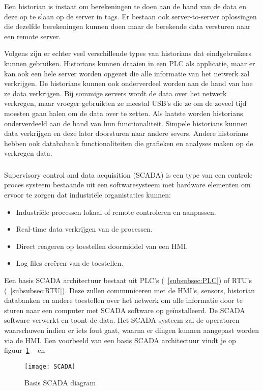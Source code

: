 Een historian is instaat om berekeningen te doen aan de hand van de data en deze op te slaan op de server in tags. Er bestaan ook server-to-server oplossingen die dezelfde berekeningen kunnen doen maar de berekende data versturen naar een remote server.~\autocite{Solutions} 

Volgens \textcite{Rinaldi} zijn er echter veel verschillende types van historians dat eindgebruikers kunnen gebruiken. Historians kunnen draaien in een PLC als applicatie, maar er kan ook een hele server worden opgezet die alle informatie van het netwerk zal verkrijgen. De historians kunnen ook onderverdeel worden aan de hand van hoe ze data verkrijgen. Bij sommige servers wordt de data over het netwerk verkregen, maar vroeger gebruikten ze meestal USB's die ze om de zoveel tijd moesten gaan halen om de data over te zetten. Als laatste worden historians onderverdeeld aan de hand van hun functionaliteit. Simpele historians kunnen data verkrijgen en deze later doorsturen naar andere severs. Andere historians hebben ook datababank functionaliteiten die grafieken en analyses maken op de verkregen data.


\subsubsection{}
\label{subsubsec:SCADA}

Supervisory control and data acquisition (SCADA) is een type van een controle proces systeem bestaande uit een softwaresysteem met hardware elementen om ervoor te zorgen dat industriële organistaties kunnen: 
\begin{itemize}
    \item Industriële processen lokaal of remote controleren en aanpassen.
    \item Real-time data verkrijgen van de processen.
    \item Direct reageren op toestellen doormiddel van een HMI.
    \item Log files creëren van de toestellen.
\end{itemize}
Een basis SCADA architectuur bestaat uit PLC's (~\ref{subsubsec:PLC}) of RTU's (~\ref{subsubsec:RTU}). Deze zullen communiceren met de HMI's, sensors, historian databanken en andere toestellen over het netwerk om alle informatie door te sturen naar een computer met SCADA software op geïnstalleerd. De SCADA software verwerkt en toont de data. Het SCADA systeem zal de operatoren waarschuwen indien er iets fout gaat, waarna er dingen kunnen aangepast worden via de HMI. Een voorbeeld van een basis SCADA architectuur vindt je op figuur~\ref{fig:2.7}  ~\autocite{Muthukrishnan2021} en ~\autocite{2018a}
\begin{figure}
    \texttt{[image: SCADA]}
    \caption{Basis SCADA diagram\autocite{2018a} \label{fig:2.7}} 
\end{figure}  


